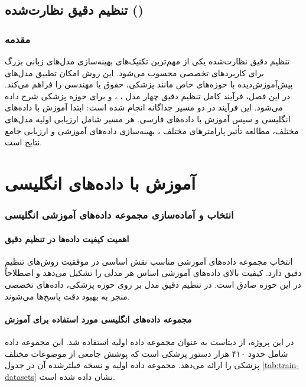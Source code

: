 \documentclass[11pt, a4paper, oneside]{book}
\begin{document}
	\chapter{تنظیم دقیق نظارت‌شده ()}

	\section{مقدمه}
	تنظیم دقیق نظارت‌شده یکی از مهم‌ترین تکنیک‌های بهینه‌سازی مدل‌های زبانی بزرگ برای کاربردهای تخصصی محسوب می‌شود. این روش امکان تطبیق مدل‌های پیش‌آموزش‌دیده با حوزه‌های خاص مانند پزشکی، حقوق یا مهندسی را فراهم می‌کند. در این فصل، فرآیند کامل تنظیم دقیق چهار مدل ، ،  و  برای حوزه پزشکی شرح داده می‌شود. این فرآیند در دو مسیر جداگانه انجام شده است: ابتدا آموزش با داده‌های انگلیسی و سپس آموزش با داده‌های فارسی. هر مسیر شامل ارزیابی اولیه مدل‌های مختلف، مطالعه تأثیر پارامترهای مختلف ، بهینه‌سازی داده‌های آموزشی و ارزیابی جامع نتایج است.

	\part{آموزش با داده‌های انگلیسی}

	\section{انتخاب و آماده‌سازی مجموعه داده‌های آموزشی انگلیسی}
	\subsection{اهمیت کیفیت داده‌ها در تنظیم دقیق}
	انتخاب مجموعه داده‌های آموزشی مناسب نقش اساسی در موفقیت روش‌های تنظیم دقیق دارد. کیفیت بالای داده‌های آموزشی اساس هر مدلی را تشکیل می‌دهد و اصطلاحاً \emph{} در این حوزه صادق است. در تنظیم دقیق مدل بر روی حوزه پزشکی، داده‌های تخصصی منجر به بهبود دقت پاسخ‌ها می‌شوند.

	\subsection{مجموعه داده‌های انگلیسی مورد استفاده برای آموزش}
	در این پروژه، از دیتاست  به عنوان مجموعه داده اولیه استفاده شد. این مجموعه داده شامل حدود ۴۱۰ هزار دستور پزشکی است که پوشش جامعی از موضوعات مختلف پزشکی را ارائه می‌دهد. مجموعه داده اولیه و نسخه فیلترشده آن در جدول \ref{tab:train-datasets} نشان داده شده است.
\end{document}
